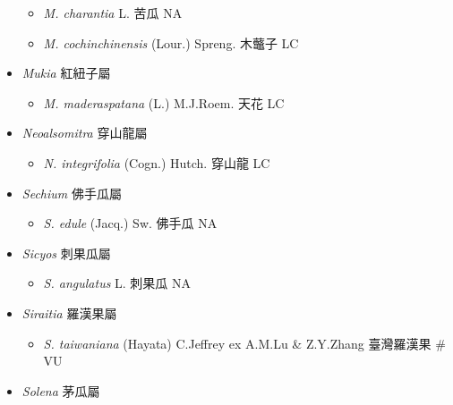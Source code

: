 \begin{itemize}
  \begin{itemize}
        \item[] \textit{M. charantia} L.  苦瓜   NA
        \item[] \textit{M. cochinchinensis} (Lour.) Spreng.  木虌子   LC
  \end{itemize}
 \item[] \textit{Mukia} 紅紐子屬
                                
  \begin{itemize}
        \item[] \textit{M. maderaspatana} (L.) M.J.Roem.  天花   LC
  \end{itemize}
 \item[] \textit{Neoalsomitra} 穿山龍屬
                                
  \begin{itemize}
        \item[] \textit{N. integrifolia} (Cogn.) Hutch.  穿山龍   LC
  \end{itemize}
 \item[] \textit{Sechium} 佛手瓜屬
                                
  \begin{itemize}
        \item[] \textit{S. edule} (Jacq.) Sw.  佛手瓜   NA
  \end{itemize}
 \item[] \textit{Sicyos} 刺果瓜屬
                                
  \begin{itemize}
        \item[] \textit{S. angulatus} L.  刺果瓜   NA
  \end{itemize}
 \item[] \textit{Siraitia} 羅漢果屬
                                
  \begin{itemize}
        \item[] \textit{S. taiwaniana} (Hayata) C.Jeffrey ex A.M.Lu \& Z.Y.Zhang  臺灣羅漢果  \# VU
  \end{itemize}
 \item[] \textit{Solena} 茅瓜屬
                                

\end{itemize}
